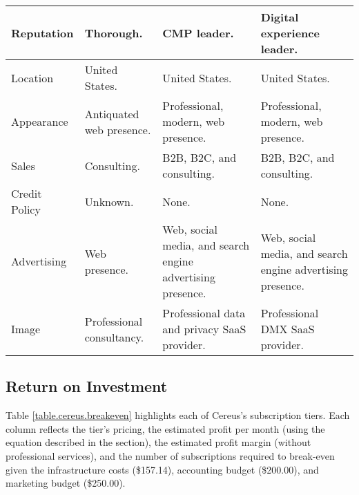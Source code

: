 \begin{sidewaystable}
\begin{tabularx}{\textwidth}{p{2.5cm} | p{6.5cm} | p{6.5cm} | p{6.5cm}}
    Reputation & Thorough. & CMP leader. & Digital experience leader. \\

    \hline

    Location & United States. & United States. & United States. \\

    \hline

    Appearance & Antiquated web presence. & Professional, modern, web presence. & Professional, modern, web presence. \\

    \hline

    Sales & Consulting. & B2B, B2C, and consulting. & B2B, B2C, and consulting. \\

    \hline

    Credit Policy & Unknown. & None. & None. \\

    \hline

    Advertising & Web presence. & Web, social media, and search engine advertising presence. & Web, social media, and search engine advertising presence. \\

    \hline

    Image & Professional consultancy. & Professional data and privacy SaaS provider. & Professional DMX SaaS provider. \\


\end{tabularx}
\label{table.cereus.companal}
\end{sidewaystable}

\subsection{Return on Investment}

Table \ref{table.cereus.breakeven} highlights each of Cereus's subscription tiers. Each column reflects the tier's pricing, the estimated profit per month (using the equation described in the  section), the estimated profit margin (without professional services), and the number of subscriptions required to break-even given the infrastructure costs (\$157.14), accounting budget (\$200.00), and marketing budget (\$250.00).

